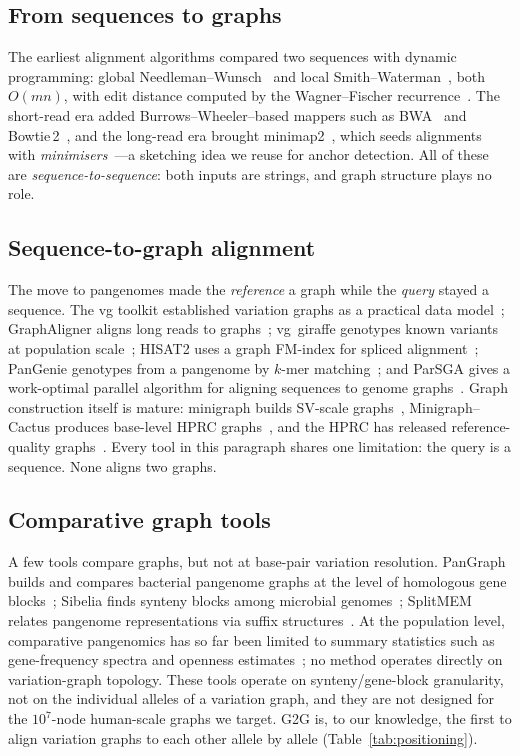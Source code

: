 \documentclass[conference]{IEEEtran}
\theoremstyle{plain}
\theoremstyle{definition}
\begin{document}
\subsection{From sequences to graphs}
The earliest alignment algorithms compared two
sequences with dynamic programming: global Needleman--Wunsch~\cite{needleman1970general}
and local Smith--Waterman~\cite{smith1981identification}, both
$O(mn)$, with edit distance computed by the Wagner--Fischer
recurrence~\cite{wagner1974string}. The short-read era added
Burrows--Wheeler--based mappers such as BWA~\cite{li2009bwa} and
Bowtie\,2~\cite{langmead2012fast}, and the long-read era brought
minimap2~\cite{li2018minimap2}, which seeds alignments with
\emph{minimisers}~\cite{roberts2004minimizers}---a sketching idea we reuse for
anchor detection. All of these are \emph{sequence-to-sequence}: both inputs are
strings, and graph structure plays no role.

\subsection{Sequence-to-graph alignment} The move to pangenomes made the
\emph{reference} a graph while the \emph{query} stayed a sequence. The vg
toolkit established variation graphs as a practical data
model~\cite{garrison2018vg}; GraphAligner aligns long reads to
graphs~\cite{rautiainen2020graphaligner}; vg~giraffe genotypes known variants at
population scale~\cite{siren2021giraffe}; HISAT2 uses a graph FM-index for
spliced alignment~\cite{kim2019hisat2}; PanGenie genotypes from a
pangenome by $k$-mer matching~\cite{ebler2022pangenie}; and ParSGA gives a
work-optimal parallel algorithm for aligning sequences to genome
graphs~\cite{xu2025parsga}. Graph construction
itself is mature: minigraph builds SV-scale graphs~\cite{li2020minigraph},
Minigraph--Cactus produces base-level HPRC
graphs~\cite{hickey2023pangenome,garrison2023pangenome}, and the HPRC has
released reference-quality graphs~\cite{hprc2023}. Every tool in this paragraph
shares one limitation: the query is a sequence. None aligns two graphs.

\subsection{Comparative graph tools} A few tools compare graphs, but not at
base-pair variation resolution. PanGraph builds and compares bacterial
pangenome graphs at the level of homologous gene
blocks~\cite{noll2023pangraph}; Sibelia finds synteny blocks among microbial
genomes~\cite{minkin2013sibelia}; SplitMEM relates pangenome representations via
suffix structures~\cite{marcus2014splitmem}. At the population level, comparative pangenomics has so far been limited to
summary statistics such as gene-frequency spectra and openness
estimates~\cite{hyun2022pangenomics}; no method operates directly on
variation-graph topology. These tools operate on synteny/gene-block
granularity, not on the individual alleles of a variation graph, and they are
not designed for the $10^7$-node human-scale graphs we target. \textsc{G2G} is, to our knowledge, the first to align variation graphs
to each other allele by allele (Table~\ref{tab:positioning}).
\end{document}
